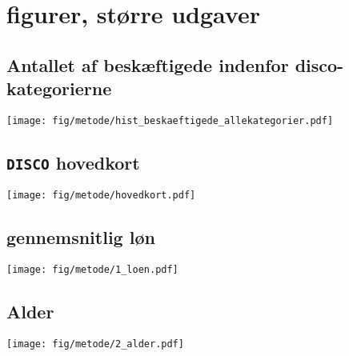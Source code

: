

\chapter{figurer, større udgaver}

\newpage

\centering
\begin{vplace}
\section{Antallet af beskæftigede indenfor disco-kategorierne} 
\vspace{\baselineskip}
\vspace{15\baselineskip}
\end{vplace}

\begin{sidewaysfigure}
\centering
\texttt{[image: fig/metode/hist\_beskaeftigede\_allekategorier.pdf]}
\label{ap_fig_hist_beskaeftigede_allekategorier}
\end{sidewaysfigure}

\newpage

\centering
\begin{vplace}
\section{\texttt{DISCO} hovedkort} 
\vspace{\baselineskip}
\vspace{15\baselineskip}
\end{vplace}

\begin{sidewaysfigure}
\centering
\texttt{[image: fig/metode/hovedkort.pdf]}
\label{ap_fig_hovedkort_disco}
\end{sidewaysfigure}

\newpage

\centering
\begin{vplace}
\section{gennemsnitlig løn} 
\vspace{\baselineskip}
\vspace{15\baselineskip}
\end{vplace}

\begin{sidewaysfigure}
\centering
\texttt{[image: fig/metode/1\_loen.pdf]}
\end{sidewaysfigure}

\newpage

\centering
\begin{vplace}
\section{Alder} 
\vspace{\baselineskip}
\vspace{15\baselineskip}
\end{vplace}

\begin{sidewaysfigure}
\centering
\texttt{[image: fig/metode/2\_alder.pdf]}
\end{sidewaysfigure}

\newpage



